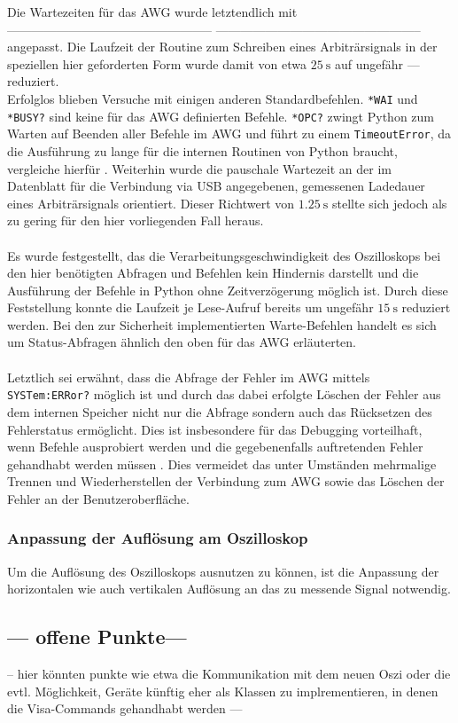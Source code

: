 \documentclass[../Report.tex]{subfiles}
\begin{document}
Die Wartezeiten für das AWG wurde letztendlich mit
--------------------------------------------------
--------------------------------------------------
angepasst. Die Laufzeit der Routine zum Schreiben eines Arbiträrsignals in der speziellen hier geforderten Form wurde damit von etwa $\SI{25}{\s}$ auf ungefähr --- reduziert.
\\
Erfolglos blieben Versuche mit einigen anderen Standardbefehlen.
\lstinline{*WAI} und \lstinline{*BUSY?} sind keine für das AWG definierten Befehle.
\lstinline{*OPC?} zwingt Python zum Warten auf Beenden aller Befehle im AWG und führt zu einem \lstinline{TimeoutError}, da die Ausführung zu lange für die internen Routinen von Python braucht, vergleiche hierfür \cite[S. 9]{troeser13}.
Weiterhin wurde die pauschale Wartezeit an der im Datenblatt \cite[S. 21]{keysData14} für die Verbindung via USB angegebenen, gemessenen Ladedauer eines Arbiträrsignals orientiert. Dieser Richtwert von $\SI{1.25}{\s}$ stellte sich jedoch als zu gering für den hier vorliegenden Fall heraus.
\\
\\
Es wurde festgestellt, das die Verarbeitungsgeschwindigkeit des Oszilloskops bei den hier benötigten Abfragen und Befehlen kein Hindernis darstellt und die Ausführung der Befehle in Python ohne Zeitverzögerung möglich ist. Durch diese Feststellung konnte die Laufzeit je Lese-Aufruf bereits um ungefähr $\SI{15}{\s}$ reduziert werden.
Bei den zur Sicherheit implementierten Warte-Befehlen handelt es sich um Status-Abfragen ähnlich den oben für das AWG erläuterten.
\\
\\
Letztlich sei erwähnt, dass die Abfrage der Fehler im AWG mittels  \lstinline{SYSTem:ERRor?} möglich ist und durch das dabei erfolgte Löschen der Fehler aus dem internen Speicher nicht nur die Abfrage sondern auch das Rücksetzen des Fehlerstatus ermöglicht. Dies ist insbesondere für das Debugging vorteilhaft, wenn Befehle ausprobiert werden und die gegebenenfalls auftretenden Fehler gehandhabt werden müssen \cite[S. 454]{keysHand15}. Dies vermeidet das unter Umständen mehrmalige Trennen und Wiederherstellen der Verbindung zum AWG sowie das Löschen der Fehler an der Benutzeroberfläche.

\subsubsection{Anpassung der Auflösung am Oszilloskop}

Um die Auflösung des Oszilloskops ausnutzen zu können, ist die Anpassung der horizontalen wie auch vertikalen Auflösung an das zu messende Signal notwendig.


\subsection{--- offene Punkte---}
\label{subsec:vorg.geraete.open}
-- hier könnten punkte wie etwa die Kommunikation mit dem neuen Oszi oder die evtl. Möglichkeit, Geräte künftig eher als Klassen zu implrementieren, in denen die Visa-Commands gehandhabt werden --- 
\end{document}
